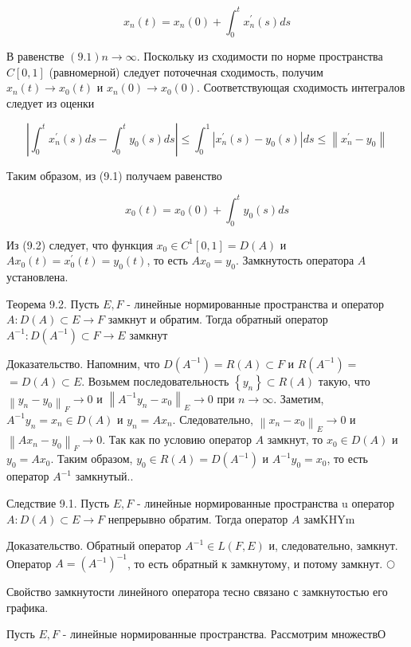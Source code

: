\[
x_{n}(t)=x_{n}(0)+\int_{0}^{t} x_{n}^{\prime}(s) d s
\]

В равенстве $(9.1) n \rightarrow \infty$. Поскольку из сходимости по норме пространства $C[0,1]$ (равномерной) следует поточечная сходимость, получим $x_{n}(t) \rightarrow x_{0}(t)$ и $x_{n}(0) \rightarrow x_{0}(0)$. Соответствующая сходимость интегралов следует из оценки

\[
\left|\int_{0}^{t} x_{n}^{\prime}(s) d s-\int_{0}^{t} y_{0}(s) d s\right| \leq \int_{0}^{1}\left|x_{n}^{\prime}(s)-y_{0}(s)\right| d s \leq\left\|x_{n}^{\prime}-y_{0}\right\|
\]

Таким образом, из (9.1) получаем равенство

\[
x_{0}(t)=x_{0}(0)+\int_{0}^{t} y_{0}(s) d s
\]

Из (9.2) следует, что функция $x_{0} \in C^{1}[0,1]=D(A)$ и $A x_{0}(t)=x_{0}^{\prime}(t)=y_{0}(t)$, то есть $A x_{0}=y_{0}$. Замкнутость оператора $A$ установлена.

Теорема 9.2. Пусть $E, F$ - линейные нормированные пространства и оператор $A: D(A) \subset E \rightarrow F$ замкнут и обратим. Тогда обратный оператор $A^{-1}: D\left(A^{-1}\right) \subset F \rightarrow E$ замкнут

Доказательство. Напомним, что $D\left(A^{-1}\right)=R(A) \subset F$ и $R\left(A^{-1}\right)=$ $=D(A) \subset E$. Возьмем последовательность $\left\{y_{n}\right\} \subset R(A)$ такую, что $\left\|y_{n}-y_{0}\right\|_{F} \rightarrow 0$ и $\left\|A^{-1} y_{n}-x_{0}\right\|_{E} \rightarrow 0$ при $n \rightarrow \infty$. Заметим, $A^{-1} y_{n}=x_{n} \in D(A)$ и $y_{n}=A x_{n}$. Следовательно, $\left\|x_{n}-x_{0}\right\|_{E} \rightarrow 0$ и $\left\|A x_{n}-y_{0}\right\|_{F} \rightarrow 0$. Так как по условию оператор $A$ замкнут, то $x_{0} \in D(A)$ и $y_{0}=A x_{0}$. Таким образом, $y_{0} \in R(A)=D\left(A^{-1}\right)$ и $A^{-1} y_{0}=x_{0}$, то есть оператор $A^{-1}$ замкнутый..

Следствие 9.1. Пусть $E, F$ - линейные нормированные пространства u оператор $A: D(A) \subset E \rightarrow F$ непрерывно обратим. Тогда оператор $A$ замKHYm

Доказательство. Обратный оператор $A^{-1} \in L(F, E)$ и, следовательно, замкнут. Оператор $A=\left(A^{-1}\right)^{-1}$, то есть обратный к замкнутому, и потому замкнут. $\bigcirc$

Свойство замкнутости линейного оператора тесно связано с замкнутостью его графика.

Пусть $E, F$ - линейные нормированные пространства. Рассмотрим множествО

